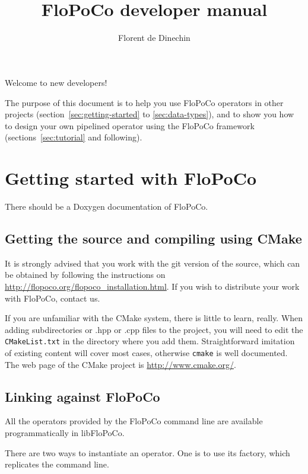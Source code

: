 \documentclass{article}
\title{\scalebox{0.3}{\mbox{}}\\
FloPoCo  developer manual
}
\author{Florent de Dinechin}
\begin{document}
 
\sloppy



\maketitle


Welcome to new developers! 

The purpose of this document is to help you use FloPoCo operators in other projects (section~\ref{sec:getting-started} to \ref{sec:data-types}), and to show you how to design your own pipelined operator using the FloPoCo framework (sections~\ref{sec:tutorial} and following). 

\tableofcontents

\section{Getting started with FloPoCo\label{sec:getting-started}}

There should be a Doxygen documentation of FloPoCo.

\subsection{Getting the source and compiling using CMake}

It is strongly advised that you work with the git version of the source, which can be obtained by following the instructions on
\url{http://flopoco.org/flopoco_installation.html}. If you wish to distribute your work with FloPoCo, contact us.

If you are unfamiliar with the CMake system, there is little to learn, really.
When adding subdirectories or .hpp or .cpp files to the project, you will need to edit the \texttt{CMakeList.txt} in the directory where you add them.
Straightforward imitation of existing content  will cover most cases, otherwise \texttt{cmake} is well documented.
The web page of the CMake project is \url{http://www.cmake.org/}.

\iffalse %
\subsection{Linking against FloPoCo\label{sec:linking}}
All the operators provided by the FloPoCo command line are available programmatically in libFloPoCo.

There are two ways to instantiate an operator.
One is to use its factory, which replicates the command line.
\end{document}
